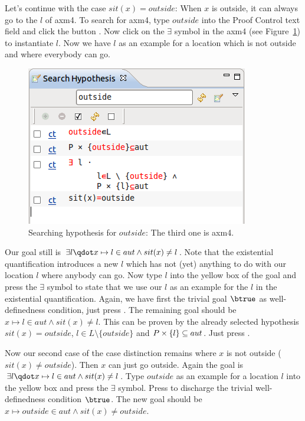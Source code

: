 Let's continue with the case $sit(x)=outside$: When $x$ is outside, it can always go to the $l$ of \textsf{axm4}.
To search for \textsf{axm4}, type $outside$ into the \textsf{Proof Control} text field and click the button . Now click on the $\exists$ symbol in the \textsf{axm4} (see Figure~\ref{fig_tut_10_search_hypotheses})
to instantiate $l$.
Now we have $l$ as an example for a location which is not outside and where everybody can go.
\begin{figure}[!ht]
  \begin{center}
    \includegraphics{img/tutorial/tut_10_search_hyp.png}
    \caption{Searching hypothesis for $outside$: The third one is \textsf{axm4}.}
    \label{fig_tut_10_search_hypotheses}
  \end{center}
\end{figure}
Our goal still is $\exists l\qdot x\mapsto l\in aut \land sit(x)\neq l$.
Note that the existential quantification introduces a new $l$ which has not (yet) anything to do with
 our location $l$ where anybody can go.
Now type $l$ into the yellow box of the goal and press the $\exists$ symbol to state that we use our $l$ as
  an example for the $l$ in the existential quantification.
Again, we have first the trivial goal $\btrue$ as well-definedness condition, just press .
The remaining goal should be $x\mapsto l\in aut \land sit(x)\neq l$.
This can be proven by the already selected hypothesis $sit(x)=outside$, $l\in L\setminus\{outside\}$ and $P\mathbin\times\{l\}\subseteq aut$. Just
  press .

Now our second case of the case distinction remains where $x$ is not outside ($sit(x)\neq outside$). Then $x$ can just go outside.
Again the goal is $\exists l\qdot x\mapsto l\in aut \land sit(x)\neq l$. Type
$outside$ as an example for a location $l$ into the yellow box and press
the $\exists$ symbol.
Press   to discharge the trivial well-definedness condition $\btrue$.
The new goal should be $x \mapsto outside\in aut \land sit(x)\neq outside$.

